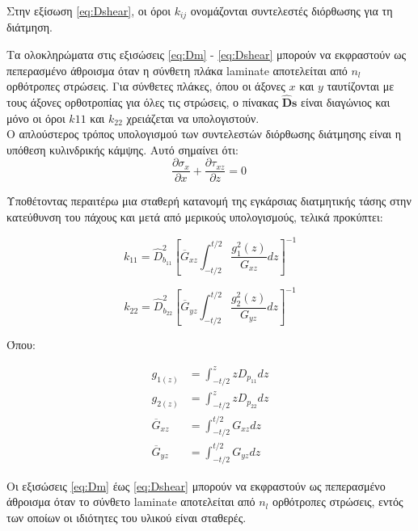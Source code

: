 Στην εξίσωση \ref{eq:Dshear}, οι όροι $k_{ij}$ ονομάζονται συντελεστές διόρθωσης για τη διάτμηση.

Τα ολοκληρώματα στις εξισώσεις \ref{eq:Dm} - \ref{eq:Dshear} μπορούν να εκφραστούν ως πεπερασμένο άθροισμα όταν η σύνθετη πλάκα \textlatin{laminate} αποτελείται από $n_{l}$ ορθότροπες στρώσεις. Για σύνθετες πλάκες, όπου οι άξονες $x$ και $y$ ταυτίζονται με τους άξονες ορθοτροπίας για όλες τις στρώσεις, ο πίνακας ${\hat{\mathbf{D}}}{\mathbf{s}}$ είναι διαγώνιος και μόνο οι όροι $k{11}$ και $k_{22}$ χρειάζεται να υπολογιστούν.
\\
Ο απλούστερος τρόπος υπολογισμού των συντελεστών διόρθωσης διάτμησης είναι η υπόθεση κυλινδρικής κάμψης. Αυτό σημαίνει ότι:
\begin{equation}
\frac{\partial\sigma_{x}}{\partial x} + \frac{\partial\tau_{xz}}{\partial z} = 0\ 
\end{equation}

Υποθέτοντας περαιτέρω μια σταθερή κατανομή της εγκάρσιας διατμητικής τάσης στην κατεύθυνση του πάχους και μετά από μερικούς υπολογισμούς, τελικά προκύπτει:

\begin{equation}
k_{11} = {\hat{D}}_{b_{11}}^{2}\left\lbrack {\overline{G}}_{xz}\int_{- t\text{/}2}^{t\text{/}2}{\frac{g_{1}^{2}(z)}{G_{xz}}dz} \right\rbrack^{- 1}
\end{equation}

\begin{equation}
k_{22} = {\hat{D}}_{b_{22}}^{2}\left\lbrack {\overline{G}}_{yz}\int_{- t\text{/}2}^{t\text{/}2}{\frac{g_{2}^{2}(z)}{G_{yz}}dz} \right\rbrack^{- 1}
\end{equation}

Όπου:

\begin{align*}
  g_{1(z)} &= \int_{- t\text{/}2}^{z}{zD_{p_{11}}dz}\\
  g_{2(z)} &= \int_{- t\text{/}2}^{z}{zD_{p_{22}}dz}\\
  {\overline{G}}_{xz} &= \int_{- t\text{/}2}^{t\text{/}2}G_{xz}dz\\
  {\overline{G}}_{yz} &= \int_{- t\text{/}2}^{t\text{/}2}G_{yz}dz
\end{align*}


Οι εξισώσεις \eqref{eq:Dm} έως \eqref{eq:Dshear} μπορούν να εκφραστούν ως πεπερασμένο άθροισμα όταν το σύνθετο \textlatin{laminate} αποτελείται από $n_{l}$ ορθότροπες στρώσεις, εντός των οποίων οι ιδιότητες του υλικού είναι σταθερές.

